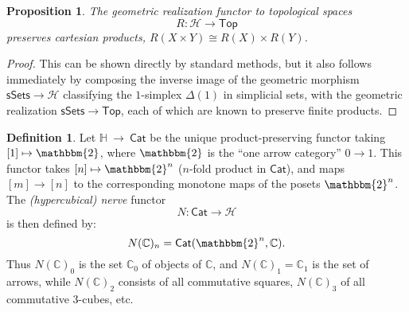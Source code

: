 \documentclass[11pt]{article}
\newcommand{\bbtwo}{\ensuremath{\mathbbm{2}}}
\newcommand{\C}{\ensuremath{\mathbb{C}}}
\newcommand{\Cat}{\ensuremath{\mathsf{Cat}}}
\renewcommand{\H}{\ensuremath{\mathbb{H}}}
\newcommand{\HH}{\ensuremath{\mathcal{H}}}
\newtheorem{proposition}[theorem]{Proposition}
\theoremstyle{remark}
\theoremstyle{definition}
\newtheorem{definition}[theorem]{Definition}
\begin{document}
\begin{proposition}
The geometric realization functor to topological spaces 
$$R: \HH \to \mathsf{Top}$$
preserves cartesian products, $R(X\times Y) \cong R(X)\times R(Y)$.
\end{proposition}

\begin{proof}
This can be shown directly by standard methods, but it also follows immediately by composing the inverse image of the geometric morphism $\mathsf{sSets} \to \HH$ classifying the $1$-simplex $\Delta(1)$ in simplicial sets, with the geometric realization $\mathsf{sSets} \to \mathsf{Top}$, each of which are known to preserve finite products.
\end{proof}

\begin{definition}
Let $\H\ \to\  \Cat$ be the unique product-preserving functor taking $[1] \mapsto \bbtwo$, where $\bbtwo$ is the ``one arrow category'' $0\rightarrow 1$.  This functor takes $[n] \mapsto \bbtwo^n$ ($n$-fold product in $\Cat$), and maps $[m] \to [n]$  to the corresponding monotone maps of the posets $\bbtwo^n$.  The  \emph{(hypercubical) nerve} functor $$N : \Cat \to \HH$$ is then defined by:
\[
N(\C)_n = \Cat(\bbtwo^n, \C).
\]
Thus $N(\C)_0$ is the set $\C_0$  of objects of \C, and $N(\C)_1 = \C_1$ is the set of arrows, while $N(\C)_2$ consists of all commutative squares, $N(\C)_3$ of all commutative $3$-cubes, etc. 
\end{definition}
\end{document}
